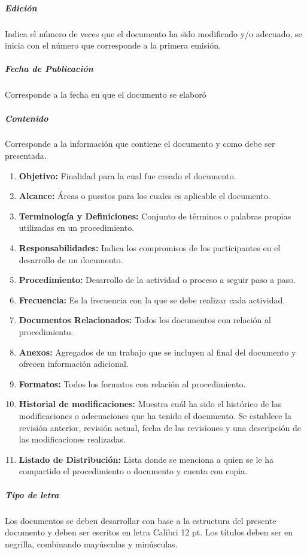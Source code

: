 \subparagraph{Edición}
Indica el número de veces que el documento ha sido modificado y/o adecuado, se inicia con el número que corresponde a la primera emisión.

\subparagraph{Fecha de Publicación}
Corresponde a la fecha en que el documento se elaboró

\subparagraph{Contenido}
Corresponde a la información que contiene el documento y como debe ser presentada.
\begin{enumerate}
    \item \textbf{Objetivo:} Finalidad para la cual fue creado el documento.
    \item \textbf{Alcance:} Áreas o puestos para los cuales es aplicable el documento.
    \item \textbf{Terminología y Definiciones:} Conjunto de términos o palabras propias utilizadas en un procedimiento.
    \item \textbf{Responsabilidades:} Indica los compromisos de los participantes en el desarrollo de un documento.
    \item \textbf{Procedimiento:} Desarrollo de la actividad o proceso a seguir paso a paso.
    \item \textbf{Frecuencia:} Es la frecuencia con la que se debe realizar cada actividad.
    \item \textbf{Documentos Relacionados:} Todos los documentos con relación al procedimiento.
    \item \textbf{Anexos:} Agregados de un trabajo que se incluyen al final del documento y ofrecen información adicional. 
    \item \textbf{Formatos:} Todos los formatos con relación al procedimiento.
    \item \textbf{Historial de modificaciones:} Muestra cuál ha sido el histórico de las modificaciones o adecuaciones que ha tenido el documento. Se establece la revisión anterior, revisión actual, fecha de las revisiones y una descripción de las modificaciones realizadas.
    \item \textbf{Listado de Distribución:} Lista donde se menciona a quien se le ha compartido el procedimiento o documento y cuenta con copia.
\end{enumerate}

\subparagraph{Tipo de letra}
Los documentos se deben desarrollar con base a la estructura del presente documento y deben ser escritos en letra Calibri 12 pt. Los títulos deben ser en negrilla, combinando mayúsculas y minúsculas.

